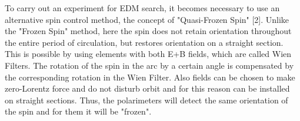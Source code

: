 \documentclass[25pt, a0paper, portrait, blockverticalspace=.5cm]{tikzposter}
\begin{document}
\begin{columns}
{\par To carry out an experiment for EDM search, it becomes necessary to use an alternative spin control method, the concept of "Quasi-Frozen Spin" [2]. Unlike the "Frozen Spin" method, here the spin does not retain orientation throughout the entire period of circulation, but restores orientation on a straight section. This is possible by using elements with both E+B fields, which are called Wien Filters. The rotation of the spin in the arc by a certain angle is compensated by the corresponding rotation in the Wien Filter.  Also fields can be chosen to make zero-Lorentz force and do not disturb orbit and for this reason can be installed on straight sections. Thus, the polarimeters will detect the same orientation of the spin and for them it will be "frozen".

	}	

\end{columns}
\end{document}
